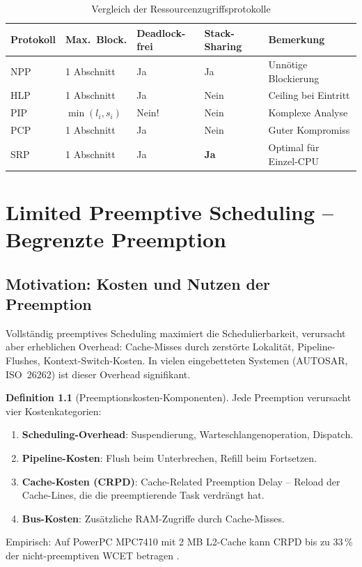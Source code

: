 ﻿\documentclass[a4paper,12pt]{report}
\theoremstyle{definition}
\newtheorem{definition}{Definition}[chapter]
\begin{document}
\begin{table}[H]
	\centering
	\caption{Vergleich der Ressourcenzugriffsprotokolle}
	{\small
	\begin{tabular}{p{2.0cm}p{1.9cm}p{1.9cm}p{2.0cm}p{3.0cm}}
		\toprule
		\textbf{Protokoll} & \textbf{Max.\ Block.} & \textbf{Deadlock-frei} & \textbf{Stack-Sharing} & \textbf{Bemerkung} \\
		\midrule
		NPP    & 1 Abschnitt & Ja & Ja & Unnötige Blockierung \\
		HLP    & 1 Abschnitt & Ja & Nein & Ceiling bei Eintritt \\
		PIP    & $\min(l_i,s_i)$ & Nein! & Nein & Komplexe Analyse \\
		PCP    & 1 Abschnitt & Ja & Nein & Guter Kompromiss \\
		SRP    & 1 Abschnitt & Ja & \textbf{Ja} & Optimal für Einzel-CPU \\
		\bottomrule
	\end{tabular}
	}
\end{table}

\chapter{Limited Preemptive Scheduling -- Begrenzte Preemption}
\label{chap:limited}

\section{Motivation: Kosten und Nutzen der Preemption}

Vollständig preemptives Scheduling maximiert die Schedulierbarkeit, verursacht aber
erheblichen Overhead: Cache-Misses durch zerstörte Lokalität, Pipeline-Flushes,
Kontext-Switch-Kosten. In vielen eingebetteten Systemen (AUTOSAR, ISO~26262) ist
dieser Overhead signifikant.

\begin{definition}[Preemptionskosten-Komponenten]
	Jede Preemption verursacht vier Kostenkategorien:
	\begin{enumerate}
		\item \textbf{Scheduling-Overhead}: Suspendierung, Warteschlangenoperation, Dispatch.
		\item \textbf{Pipeline-Kosten}: Flush beim Unterbrechen, Refill beim Fortsetzen.
		\item \textbf{Cache-Kosten (CRPD)}: Cache-Related Preemption Delay --
		      Reload der Cache-Lines, die die preemptierende Task verdrängt hat.
		\item \textbf{Bus-Kosten}: Zusätzliche RAM-Zugriffe durch Cache-Misses.
	\end{enumerate}
	Empirisch: Auf PowerPC MPC7410 mit 2 MB L2-Cache kann CRPD bis zu 33\,\%
	der nicht-preemptiven WCET betragen \cite{Buttazzo2011}.
\end{definition}
\end{document}
